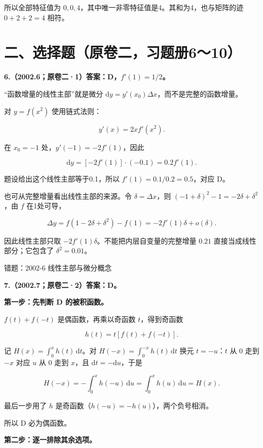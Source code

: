 \documentclass[UTF8,11pt,fontset=windows]{ctexart}
\begin{document}
所以全部特征值为 $0,0,4$，其中唯一非零特征值是4。其和为4，也与矩阵的迹 $0+2+2=4$ 相符。

\clearpage

\section*{二、选择题（原卷二，习题册6～10）}

\textbf{6.（2002.6；原卷二·1）答案：D，$f'(1)=1/2$。}

“函数增量的线性主部”就是微分 $\mathrm dy=y'(x_0)\Delta x$，而不是完整的函数增量。

对 $y=f(x^2)$ 使用链式法则：

$$
y'(x)=2x f'(x^2).
$$

在 $x_0=-1$ 处，$y'(-1)=-2f'(1)$，因此

$$
\mathrm dy=[-2f'(1)]\cdot(-0.1)=0.2f'(1).
$$

题设给出这个线性主部等于0.1，所以 $f'(1)=0.1/0.2=0.5$，对应 D。

也可从完整增量看出线性主部的来源。令 $\delta=\Delta x$，则 $(-1+\delta)^2-1=-2\delta+\delta^2$，由 $f$ 在1处可导，

$$
\Delta y=f(1-2\delta+\delta^2)-f(1)
=-2f'(1)\delta+o(\delta).
$$

因此线性主部只取 $-2f'(1)\delta$。不能把内层自变量的完整增量 $0.21$ 直接当成线性部分；它包含了 $\delta^2=0.01$。

\begingroup\color{gray}错题：2002-6 线性主部与微分概念\par\endgroup

\clearpage

\textbf{7.（2002.7；原卷二·2）答案：D。}

\textbf{第一步：先判断 D 的被积函数。}

$f(t)+f(-t)$ 是偶函数，再乘以奇函数 $t$，得到奇函数

$$
h(t)=t[f(t)+f(-t)].
$$

记 $H(x)=\int_0^x h(t)\,\mathrm dt$。对 $H(-x)=\int_0^{-x}h(t)\,\mathrm dt$ 换元 $t=-u$：$t$ 从 $0$ 走到 $-x$ 对应 $u$ 从 $0$ 走到 $x$，且 $\mathrm dt=-\mathrm du$，于是

$$
H(-x)=-\int_0^x h(-u)\,\mathrm du=\int_0^x h(u)\,\mathrm du=H(x).
$$

最后一步用了 $h$ 是奇函数（$h(-u)=-h(u)$），两个负号相消。

所以 D 必为偶函数。

\textbf{第二步：逐一排除其余选项。}
\end{document}
